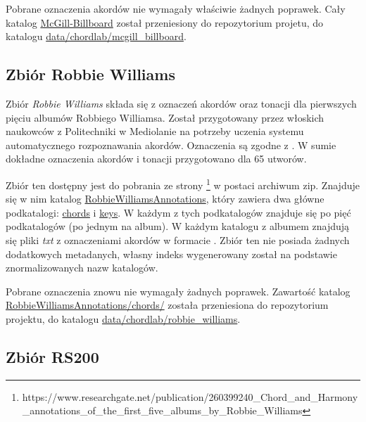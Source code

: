 Pobrane oznaczenia akordów nie wymagały właściwie żadnych poprawek. Cały katalog
\url{McGill-Billboard} został przeniesiony do repozytorium projetu, do katalogu
\url{data/chordlab/mcgill\_billboard}.

\subsection{Zbiór Robbie Williams}

Zbiór \emph{Robbie Williams} \cite{giorgi_automatic_2013} składa się z oznaczeń akordów oraz tonacji
dla pierwszych pięciu albumów Robbiego Williamsa. Został przygotowany przez włoskich naukowców z
Politechniki w Mediolanie na potrzeby uczenia systemu automatycznego rozpoznawania akordów.
Oznaczenia są zgodne z \cite{harte_towards_nodate}. W sumie dokładne oznaczenia akordów i tonacji
przygotowano dla 65 utworów.

Zbiór ten dostępny jest do pobrania ze strony
\footnote{https://www.researchgate.net/publication/260399240\_Chord\_and\_Harmony\_annotations\_of\_the\_first\_five\_albums\_by\_Robbie\_Williams}
w postaci archiwum zip. Znajduje się w nim katalog \url{RobbieWilliamsAnnotations}, który zawiera
dwa główne podkatalogi: \url{chords} i \url{keys}. W każdym z tych podkatalogów znajduje się po pięć
podkatalogów (po jednym na album). W każdym katalogu z albumem znajdują się pliki \emph{txt} z
oznaczeniami akordów w formacie . Zbiór ten nie posiada żadnych dodatkowych metadanych,
własny indeks wygenerowany został na podstawie znormalizowanych nazw katalogów.

Pobrane oznaczenia znowu nie wymagały żadnych poprawek. Zawartość katalog
\url{RobbieWilliamsAnnotations/chords/} została przeniesiona do repozytorium projektu, do katalogu
\url{data/chordlab/robbie\_williams}.

\subsection{Zbiór RS200}

